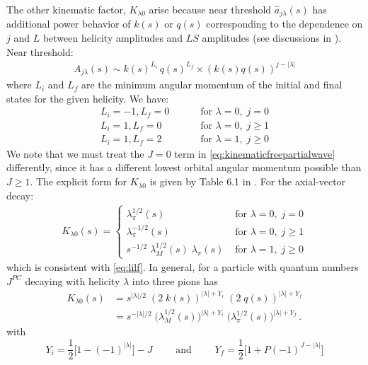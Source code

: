 \documentclass[10pt, aps,prd,amsmath,amssymb,superscriptaddress,onecolumn,
nofootinbib,showpacs,preprintnumbers]{revtex4-1}
\newcommand{\mand}{\qquad \text{ and } \qquad}
\begin{document}
The other kinematic factor, \(K_{\lambda0}\) arise  because near threshold \(\hat{a}_{j\lambda}(s)\) has additional power behavior of \(k(s)\) or \(q(s)\) corresponding to the dependence on \(j\) and \(L\) between helicity amplitudes and \(LS\) amplitudes (see discussions in \cite{Jackson1968,Franklin1966}). Near threshold:
  \begin{gather}
    A_{j\lambda}(s) \sim k(s)^{L_i} \, q(s)^{L_f} \times (k(s)q(s))^{j- |\lambda|}
  \end{gather}
where \(L_i\) and \(L_f\) are the minimum angular momentum of the initial and final states for the given helicity. We have:
  \begin{align}
      L_i = -1, L_f = 0 &\qquad  \text{ for } \lambda = 0, \; j = 0   \nonumber \\
      L_i = 1, L_f = 0 &\qquad  \text{ for } \lambda = 0, \;  j \label{eq:lilf} \geq 1  \\
      L_i = 1 , L_f = 2& \qquad  \text{ for } \lambda = 1, \; j \geq 0 \nonumber
  \end{align}
We note that we must treat the \(J=0\) term in \cref{eq:kinematicfreepartialwave} differently, since it has a different lowest orbital angular momentum possible than \(J\geq 1\). The explicit form for \(K_{\lambda0}\) is given by Table 6.1 in \cite{Collins}. For the axial-vector decay:
  \begin{align}
    \label{eq:k-factor}
    K_{\lambda0}(s) =
    \begin{cases}
       \lambda^{1/2}_\pi(s)    &     \text{  for }\lambda = 0, \; j=0 \\
       \lambda^{-1/2}_\pi(s)  &\text{ for } \lambda = 0, \; j\geq 1 \\
       s^{-1/2} \; \lambda_M^{1/2}(s) \; \lambda_\pi(s)     &\text{ for } \lambda = 1, \; j\geq 0
    \end{cases}
  \end{align}
which is consistent with \cref{eq:lilf}. In general, for a particle with quantum numbers \(J^{PC}\) decaying with helicity \(\lambda\) into three pions has
  \begin{align}
    K_{\lambda 0}(s) &=  s^{|\lambda|/2} \; (2 \; k(s))^{|\lambda| + Y_i} \; (2 \; q(s))^{|\lambda| + Y_f} \nonumber \\
    &=  s^{-|\lambda|/2} \; \big(\lambda^{1/2}_M(s)\big)^{|\lambda| + Y_i} \; \big(\lambda_\pi^{1/2}(s)\big)^{|\lambda| + Y_f}\, .
  \end{align}
with
  \begin{equation}
    Y_i =  \frac{1}{2} \big[ 1 - (-1)^{|\lambda|}\big] - J \mand Y_f =  \frac{1}{2} \big[ 1 + P (-1)^{J- |\lambda|}]
  \end{equation}
\end{document}
